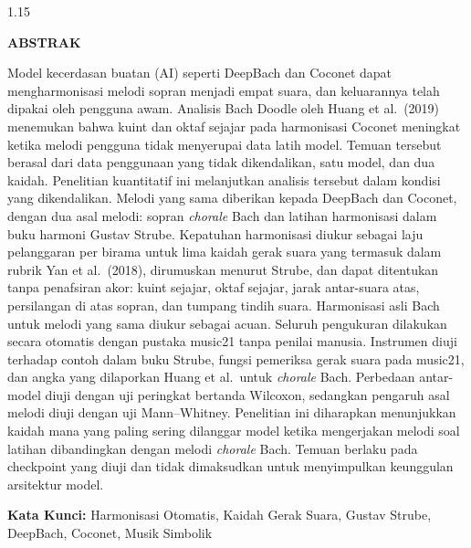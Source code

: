 \newpage
{}
{}
\begin{spacing}{1.15}
\begin{center}
    \textbf{ABSTRAK}
\end{center}

Model kecerdasan buatan (AI) seperti DeepBach dan Coconet dapat mengharmonisasi melodi sopran menjadi empat suara, dan keluarannya telah dipakai oleh pengguna awam. Analisis Bach Doodle oleh Huang et al.\ (2019) menemukan bahwa kuint dan oktaf sejajar pada harmonisasi Coconet meningkat ketika melodi pengguna tidak menyerupai data latih model. Temuan tersebut berasal dari data penggunaan yang tidak dikendalikan, satu model, dan dua kaidah. Penelitian kuantitatif ini melanjutkan analisis tersebut dalam kondisi yang dikendalikan. Melodi yang sama diberikan kepada DeepBach dan Coconet, dengan dua asal melodi: sopran \textit{chorale} Bach dan latihan harmonisasi dalam buku harmoni Gustav Strube. Kepatuhan harmonisasi diukur sebagai laju pelanggaran per birama untuk lima kaidah gerak suara yang termasuk dalam rubrik Yan et al.\ (2018), dirumuskan menurut Strube, dan dapat ditentukan tanpa penafsiran akor: kuint sejajar, oktaf sejajar, jarak antar-suara atas, persilangan di atas sopran, dan tumpang tindih suara. Harmonisasi asli Bach untuk melodi yang sama diukur sebagai acuan. Seluruh pengukuran dilakukan secara otomatis dengan pustaka music21 tanpa penilai manusia. Instrumen diuji terhadap contoh dalam buku Strube, fungsi pemeriksa gerak suara pada music21, dan angka yang dilaporkan Huang et al.\ untuk \textit{chorale} Bach. Perbedaan antar-model diuji dengan uji peringkat bertanda Wilcoxon, sedangkan pengaruh asal melodi diuji dengan uji Mann--Whitney. Penelitian ini diharapkan menunjukkan kaidah mana yang paling sering dilanggar model ketika mengerjakan melodi soal latihan dibandingkan dengan melodi \textit{chorale} Bach. Temuan berlaku pada checkpoint yang diuji dan tidak dimaksudkan untuk menyimpulkan keunggulan arsitektur model.\par

\textbf{Kata Kunci:} Harmonisasi Otomatis, Kaidah Gerak Suara, Gustav Strube, DeepBach, Coconet, Musik Simbolik
\end{spacing}

